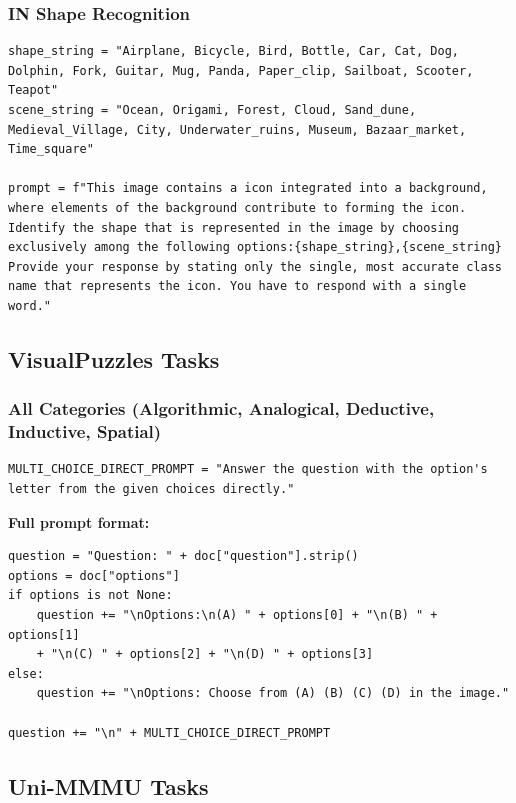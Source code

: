 \documentclass{article}
\theoremstyle{plain}
\theoremstyle{definition}
\theoremstyle{remark}
\begin{document}
\subsubsection{IN Shape Recognition}

\begin{verbatim}
shape_string = "Airplane, Bicycle, Bird, Bottle, Car, Cat, Dog,
Dolphin, Fork, Guitar, Mug, Panda, Paper_clip, Sailboat, Scooter,
Teapot"
scene_string = "Ocean, Origami, Forest, Cloud, Sand_dune,
Medieval_Village, City, Underwater_ruins, Museum, Bazaar_market,
Time_square"

prompt = f"This image contains a icon integrated into a background,
where elements of the background contribute to forming the icon.
Identify the shape that is represented in the image by choosing
exclusively among the following options:{shape_string},{scene_string}
Provide your response by stating only the single, most accurate class
name that represents the icon. You have to respond with a single word."
\end{verbatim}

\subsection{VisualPuzzles Tasks}

\subsubsection{All Categories (Algorithmic, Analogical, Deductive, Inductive, Spatial)}

\begin{verbatim}
MULTI_CHOICE_DIRECT_PROMPT = "Answer the question with the option's
letter from the given choices directly."
\end{verbatim}

\textbf{Full prompt format:}

\begin{verbatim}
question = "Question: " + doc["question"].strip()
options = doc["options"]
if options is not None:
    question += "\nOptions:\n(A) " + options[0] + "\n(B) " + options[1]
    + "\n(C) " + options[2] + "\n(D) " + options[3]
else:
    question += "\nOptions: Choose from (A) (B) (C) (D) in the image."

question += "\n" + MULTI_CHOICE_DIRECT_PROMPT
\end{verbatim}

\subsection{Uni-MMMU Tasks}
\end{document}
